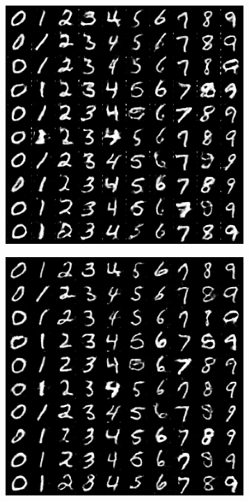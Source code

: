 \begin{figure}[H]
\begin{subfigure}{0.2\textwidth}
        \caption{}
        \label{subfig:cDCGAN/fake_sample_epoch_0002}
    \end{subfigure}%
    \begin{subfigure}{0.2\textwidth}
        \centering
        \includegraphics[width=0.95\linewidth]{cDCGAN/fake_sample_epoch_0003.png}
        \caption{}
        \label{subfig:cDCGAN/fake_sample_epoch_0003}
    \end{subfigure}%
    \begin{subfigure}{0.2\textwidth}
        \centering
        \includegraphics[width=0.95\linewidth]{cDCGAN/fake_sample_epoch_0004.png}

\end{subfigure}
\end{figure}

